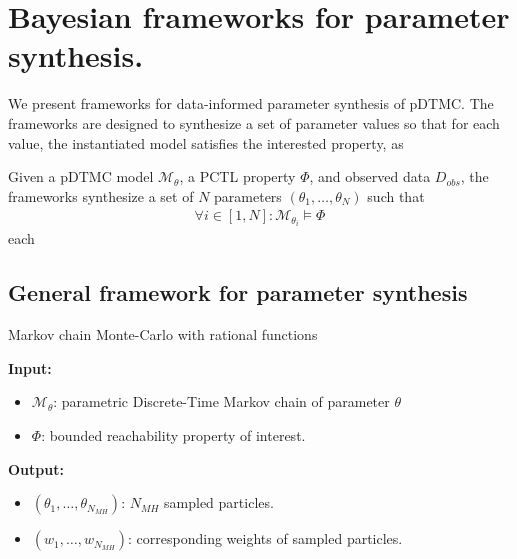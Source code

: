 \chapter{Bayesian frameworks for parameter synthesis.}
We present frameworks for data-informed parameter synthesis of pDTMC. The frameworks are designed to
synthesize a set of parameter values so that for each value, the instantiated model satisfies the
interested property, as

Given a pDTMC model $\mathcal{M}_\theta$, a PCTL property $\Phi$, and observed data $D_{obs}$, the
frameworks synthesize a set of $N$ parameters $(\theta_1,\ldots,\theta_N)$ such that
\begin{align*}
      \forall i \in [1,N]: \mathcal{M}_{\theta_i} \models \Phi
\end{align*}
each

\section{General framework for parameter synthesis}
\begin{algorithm}[H]
      \caption{Markov chain Monte-Carlo with rational functions}
      \label{rf-mcmc-alg}
      \hspace*{\algorithmicindent} \textbf{Input:}
      \begin{itemize}
            \item $\mathcal{M}_\theta$: parametric Discrete-Time Markov chain of parameter $\theta$
            \item $\Phi$: bounded reachability property of interest.
      \end{itemize}
      \hspace*{\algorithmicindent} \textbf{Output:}
      \begin{itemize}
            \item $(\theta_1,\ldots,\theta_{N_{MH}})$: $N_{MH}$ sampled particles.
            \item $(w_1,\ldots,w_{N_{MH}})$: corresponding weights of sampled particles.
      \end{itemize}
      \begin{algorithmic}[1]

            \EndProcedure
      \end{algorithmic}
\end{algorithm}
